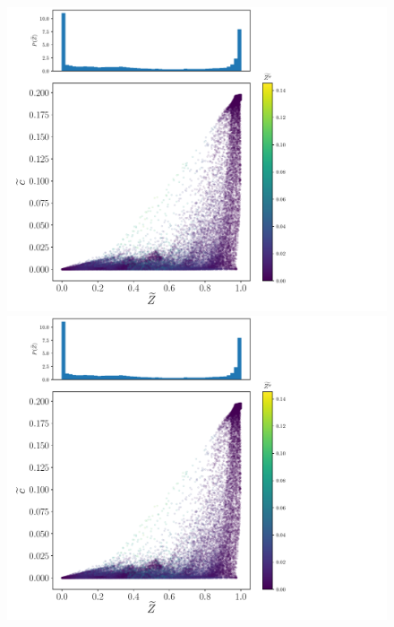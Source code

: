 \documentclass[xcolor=dvipsnames]{beamer}
\begin{document}
{\begin{figure}[!tbp]
    \includegraphics[page=2, height=0.3\textwidth, trim=1.0cm 0cm 2.4cm 0cm, clip]{./figs/inputs_dice_0003.pdf}%
    \includegraphics[page=3, height=0.3\textwidth, trim=0.0cm 0cm 2.4cm 0cm, clip]{./figs/inputs_dice_0003.pdf}%
  \end{figure}%
}
\end{document}
